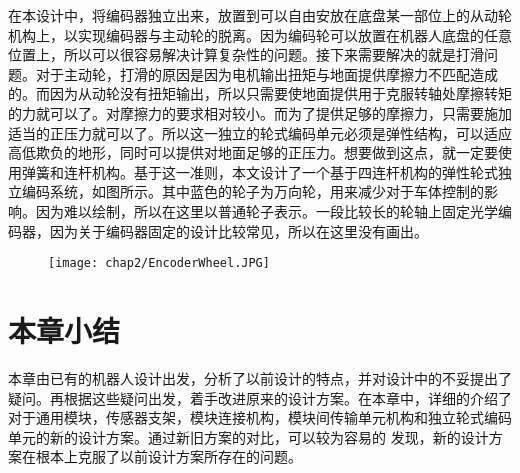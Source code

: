 在本设计中，将编码器独立出来，放置到可以自由安放在底盘某一部位上的从动轮机构上，以实现编码器与主动轮的脱离。因为编码轮可以放置在机器人底盘的任意位置上，所以可以很容易解决计算复杂性的问题。接下来需要解决的就是打滑问题。对于主动轮，打滑的原因是因为电机输出扭矩与地面提供摩擦力不匹配造成的。而因为从动轮没有扭矩输出，所以只需要使地面提供用于克服转轴处摩擦转矩的力就可以了。对摩擦力的要求相对较小。而为了提供足够的摩擦力，只需要施加适当的正压力就可以了。所以这一独立的轮式编码单元必须是弹性结构，可以适应高低欺负的地形，同时可以提供对地面足够的正压力。想要做到这点，就一定要使用弹簧和连杆机构。基于这一准则，本文设计了一个基于四连杆机构的弹性轮式独立编码系统，如图所示。其中蓝色的轮子为万向轮，用来减少对于车体控制的影响。因为难以绘制，所以在这里以普通轮子表示。一段比较长的轮轴上固定光学编码器，因为关于编码器固定的设计比较常见，所以在这里没有画出。
\begin{figure}[!htp]
  \centering
  \texttt{[image: chap2/EncoderWheel.JPG]}
\end{figure}
\section{本章小结}
本章由已有的机器人设计出发，分析了以前设计的特点，并对设计中的不妥提出了疑问。再根据这些疑问出发，着手改进原来的设计方案。在本章中，详细的介绍了对于通用模块，传感器支架，模块连接机构，模块间传输单元机构和独立轮式编码单元的新的设计方案。通过新旧方案的对比，可以较为容易的 发现，新的设计方案在根本上克服了以前设计方案所存在的问题。
